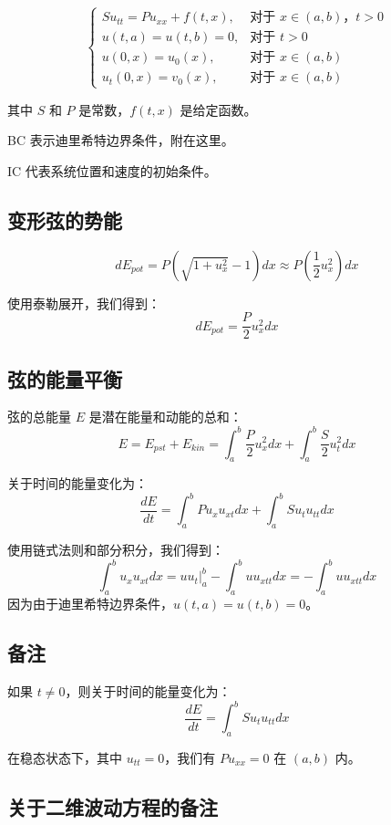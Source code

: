\documentclass{ctexart}
\begin{document}
\[
\begin{cases}
S u_{tt} = P u_{xx} + f(t,x), & \text{对于 } x \in (a,b)，t > 0 \\
u(t,a) = u(t,b) = 0, & \text{对于 } t > 0 \\
u(0,x) = u_0(x), & \text{对于 } x \in (a,b) \\
u_{t}(0,x) = v_0(x), & \text{对于 } x \in (a,b)
\end{cases}
\]

其中 \( S \) 和 \( P \) 是常数，\( f(t,x) \) 是给定函数。

BC 表示迪里希特边界条件，附在这里。

IC 代表系统位置和速度的初始条件。

\subsection*{变形弦的势能}
\[
dE_{pot} = P \left( \sqrt{1 + u_{x}^2} - 1 \right) dx \approx P \left( \frac{1}{2} u_{x}^2 \right) dx
\]

使用泰勒展开，我们得到：
\[
dE_{pot} = \frac{P}{2} u_{x}^2 dx
\]

\subsection*{弦的能量平衡}

弦的总能量 \( E \) 是潜在能量和动能的总和：
\[
E = E_{pst} + E_{kin} = \int_{a}^{b} \frac{P}{2} u_{x}^2 dx + \int_{a}^{b} \frac{S}{2} u_{t}^2 dx
\]

关于时间的能量变化为：
\[
\frac{dE}{dt} = \int_{a}^{b} P u_{x} u_{xt} dx + \int_{a}^{b} S u_{t} u_{tt} dx
\]

使用链式法则和部分积分，我们得到：
\[
\int_{a}^{b} u_{x} u_{xt} dx = u u_{t} \Big|_{a}^{b} - \int_{a}^{b} u u_{xtt} dx = -\int_{a}^{b} u u_{xtt} dx
\]
因为由于迪里希特边界条件，\( u(t,a) = u(t,b) = 0 \)。

\subsection*{备注}

如果 \( t \neq 0 \)，则关于时间的能量变化为：
\[
\frac{dE}{dt} = \int_{a}^{b} S u_{t} u_{tt} dx
\]

在稳态状态下，其中 \( u_{tt} = 0 \)，我们有 \( P u_{xx} = 0 \) 在 \( (a,b) \) 内。



\subsection*{关于二维波动方程的备注}
\end{document}
